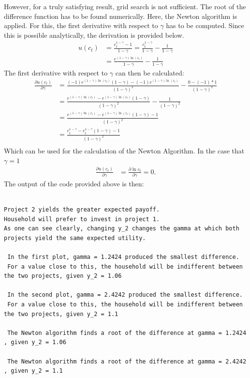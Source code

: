 \documentclass{article}
\begin{document}
However, for a truly satisfying result, grid search is not sufficient. The root of the difference function has to be found numerically. Here, the Newton algorithm is applied. For this, the first derivative with respect to $\gamma$ has to be computed. Since this is possible analytically, the derivation is provided below.
\begin{align}
u(c_t) &= \frac{c_t^{1-\gamma}-1}{1- \gamma} = \frac{c_t^{1-\gamma}}{1- \gamma} -\frac{1}{1- \gamma}\\
&= \frac{e^{(1-\gamma) \ln (c_t)}}{1- \gamma} -\frac{1}{1- \gamma}
\end{align}
The first derivative with respect to $\gamma$ can then be calculated:
\begin{align}
\frac{ \partial u(c_t)}{\partial \gamma} &= \frac{(-1)e^{(1-\gamma) \ln (c_t)} (1- \gamma)- (-1)e^{(1-\gamma) \ln (c_t)}}{(1- \gamma)^2} - \frac{0 - (-1)*1}{(1- \gamma)^2} \\
&= \frac{e^{(1-\gamma) \ln (c_t)}-e^{(1-\gamma) \ln (c_t)} (1- \gamma)}{(1- \gamma)^2} - \frac{1}{(1- \gamma)^2} \\
&= \frac{e^{(1-\gamma) \ln (c_t)}-e^{(1-\gamma) \ln (c_t)} (1- \gamma)-1}{(1- \gamma)^2} \\
&= \frac{c_t^{1- \gamma}-c_t^{1- \gamma} (1- \gamma)-1}{(1- \gamma)^2} \\  
\end{align}
Which can be used for the calculation of the Newton Algorithm.
In the case that $ \gamma = 1 $
\begin{align}\frac{ \partial u(c_t)}{\partial \gamma} &= \frac{ \partial \ln c_t}{\partial \gamma} = 0.
\end{align}
The output of the code provided above is then:
 \begin{lstlisting}[style=Matlab-editor]

Project 2 yields the greater expected payoff.
Household will prefer to invest in project 1.
As one can see clearly, changing y_2 changes the gamma at which both projects yield the same expected utility.

 In the first plot, gamma = 1.2424 produced the smallest difference. 
 For a value close to this, the household will be indifferent between the two projects, given y_2 = 1.06 
 
 In the second plot, gamma = 2.4242 produced the smallest difference. 
 For a value close to this, the household will be indifferent between the two projects, given y_2 = 1.1 

 The Newton algorithm finds a root of the difference at gamma = 1.2424 , given y_2 = 1.06 
 
 The Newton algorithm finds a root of the difference at gamma = 2.4242 , given y_2 = 1.1 
\end{lstlisting}
\end{document}
